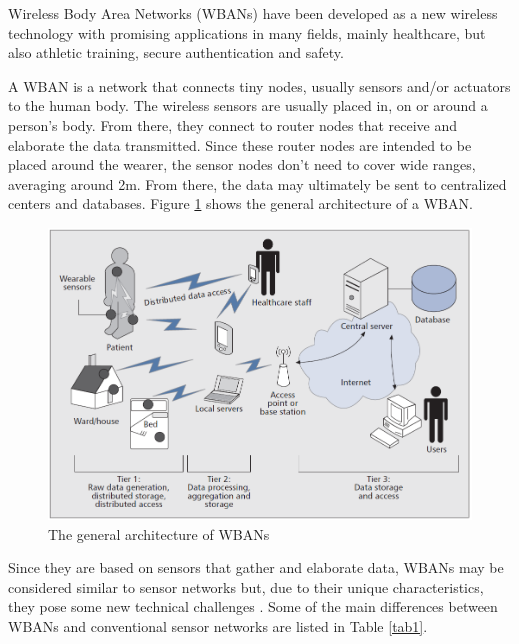 \documentclass[conference]{IEEEtran}
\begin{document}
Wireless Body Area Networks (WBANs) have been developed as a new wireless technology with promising applications in many fields, mainly healthcare, but also athletic training, secure authentication and safety.

A WBAN is a network that connects tiny nodes, usually sensors and/or actuators to the human body. The wireless sensors are usually placed in, on or around a person’s body. From there, they connect to router nodes that receive and elaborate the data transmitted. Since these router nodes are intended to be placed around the wearer, the sensor nodes don’t need to cover wide ranges, averaging around 2m. From there, the data may ultimately be sent to centralized centers and databases. Figure \ref{fig_WBAN_arch} shows the general architecture of a WBAN.

\begin{figure}[htbp]
\centering
\includegraphics[width=0.9\linewidth]{img/WBAN_arch.png}
\caption{The general architecture of WBANs}
\label{fig_WBAN_arch}
\end{figure}

Since they are based on sensors that gather and elaborate data, WBANs may be considered similar to sensor networks but, due to their unique characteristics, they pose some new technical challenges \cite{cao2009enabling}. Some of the main differences between WBANs and conventional sensor networks are listed in Table \ref{tab1}.
\end{document}
